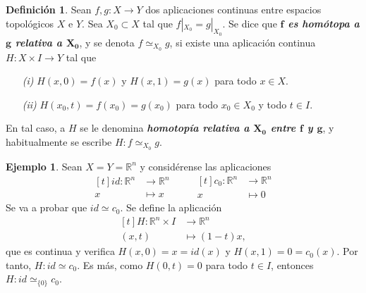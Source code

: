 \documentclass[11pt]{report}
\newenvironment{cdefinition} %
  {\begin{mdframed}[innertopmargin = 0pt,
                    innerbottommargin = 7.5pt,
                    backgroundcolor = lightgray!10,
                    linewidth = 1pt,
                    shadow = true,
                    shadowsize = 5pt,
                    roundcorner = 0pt,
                    skipabove = 0pt]
    \begin{definition}}
  {\end{definition}\end{mdframed}}
\theoremstyle{definition}
\newtheorem{definition}{Definición}[chapter]
\theoremstyle{definition}
\newtheorem{example}{Ejemplo}[chapter]
\theoremstyle{remark}
\newcommand{\R}{\mathbb R}
\begin{document}
\begin{cdefinition}
    Sean $f, g \colon X \to Y$ dos aplicaciones continuas entre espacios topológicos $X$ e $Y$. Sea $X_0 \subset X$ tal que $f|_{X_0} = g|_{X_0}$. Se dice que \textbf{\textit{$\bm{f}$ es homótopa a $\bm{g}$ relativa a $\bm{X_0}$}}, y se denota $f \simeq_{X_0} g$, si existe una aplicación continua $H \colon X \times I \to Y$ tal que 
    \begin{itemize}
        \item[\textit{(i)}] $H(x,0) = f(x)$ y $H(x,1) = g(x)$ para todo $x \in X$.
        \item[\textit{(ii)}] $H(x_0,t) = f(x_0) = g(x_0)$ para todo $x_0 \in X_0$ y todo $t \in I$.
    \end{itemize}
    En tal caso, a $H$ se le denomina \textbf{\textit{homotopía relativa a $\bm{X_0}$ entre $\bm{f}$ y $\bm{g}$}}, y habitualmente se escribe $H \colon f \simeq_{X_0} g$.
\end{cdefinition}

\begin{example}
    Sean $X = Y = \R^n$ y considérense las aplicaciones
\[
\begin{aligned}[t]
    id \colon \R^n &\longrightarrow \R^n \\
    x &\longmapsto x
\end{aligned}
\qquad
\begin{aligned}[t]
    c_0 \colon \R^n &\longrightarrow \R^n \\
    x &\longmapsto 0
\end{aligned}
\]
Se va a probar que $id \simeq c_0$. Se define la aplicación
\[
\begin{aligned}[t]
    H \colon \R^n \times I &\longrightarrow \R^n \\
    (x,t) &\longmapsto (1-t)x,
\end{aligned}
\]
que es continua y verifica $H(x,0) = x = id(x)$ y $H(x,1) = 0 = c_0(x)$. Por tanto, $H \colon id \simeq c_0$. Es más, como $H(0,t) = 0$ para todo $t \in I$, entonces $H \colon id \simeq_{\{0\}} c_0$.
\end{example}
\end{document}
